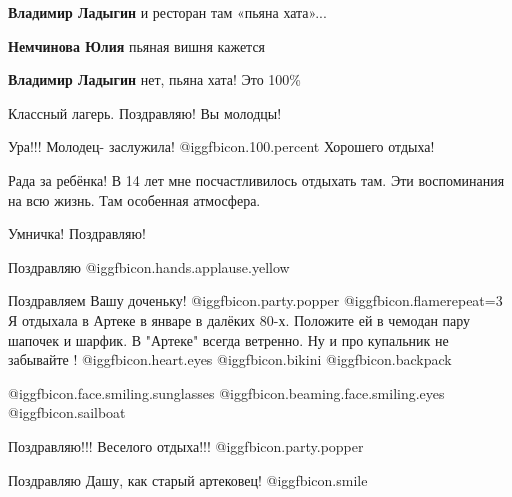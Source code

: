 \begin{itemize}
\begin{itemize} %
\textbf{Владимир Ладыгин} и ресторан там «пьяна хата»...

\textbf{Немчинова Юлия} пьяная вишня кажется

\textbf{Владимир Ладыгин} нет, пьяна хата! Это 100\%
\end{itemize} %

Классный лагерь. Поздравляю! Вы молодцы!

Ура!!! Молодец- заслужила!  @igg{fbicon.100.percent} 
Хорошего отдыха!

Рада за ребёнка! В 14 лет мне посчастливилось отдыхать там. Эти воспоминания на всю жизнь. Там особенная атмосфера.

Умничка! Поздравляю!

Поздравляю @igg{fbicon.hands.applause.yellow} 


Поздравляем Вашу доченьку!  @igg{fbicon.party.popper}  @igg{fbicon.flame}{repeat=3}  Я отдыхала в Артеке в январе в далёких
80-х. Положите ей в чемодан пару шапочек и шарфик. В "Артеке" всегда ветренно.
Ну и про купальник не забывайте ! @igg{fbicon.heart.eyes}  @igg{fbicon.bikini}  @igg{fbicon.backpack} 

\begin{itemize} %
 @igg{fbicon.face.smiling.sunglasses}  @igg{fbicon.beaming.face.smiling.eyes}  @igg{fbicon.sailboat} 
\end{itemize} %

Поздравляю!!! Веселого отдыха!!!  @igg{fbicon.party.popper} 

Поздравляю Дашу, как старый артековец!  @igg{fbicon.smile} 

\end{itemize} %
